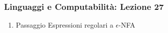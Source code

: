 




\begin{frame}[fragile]
	\frametitle{Linguaggi e Computabilità: Lezione 27}
\begin{enumerate}
\item
Passaggio Espressioni regolari a $\epsilon$-NFA
\end{enumerate}
\end{frame}



